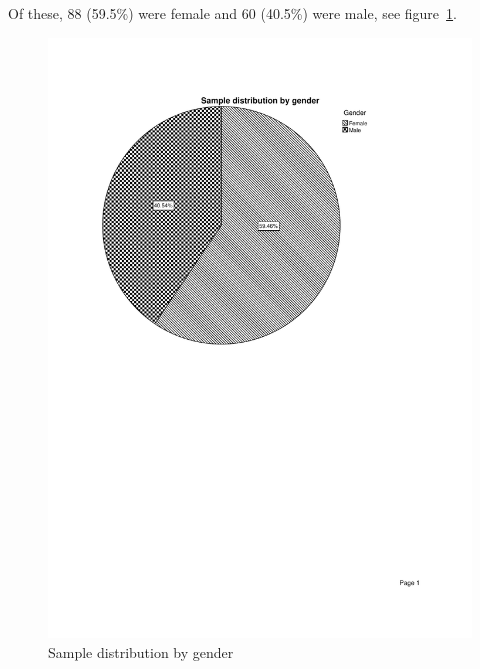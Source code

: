 \documentclass
[
	12pt,
	a4paper,
	oneside,
]{report}
\begin{document}
Of these, 88 (59.5\%) were female and 60 (40.5\%) were male, see
figure~\ref{fig:dist-gender}.
\begin{figure}[ht]
\caption{Sample distribution by gender}
\label{fig:dist-gender}
\includegraphics[width=\textwidth,
	trim={2.5cm 14cm 2.5cm 2.5cm},
	clip]{media/dist-gender}
\end{figure}
\end{document}
